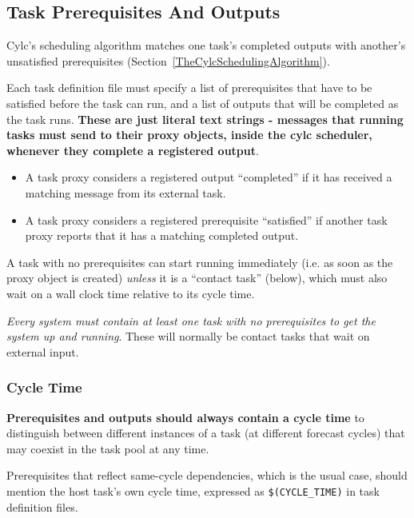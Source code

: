 \documentclass[11pt,a4paper]{article}
\begin{document}
\subsection{Task Prerequisites And Outputs}
\label{TaskPrerequisitesAndOutputs}

Cylc's scheduling algorithm matches one task's completed outputs with
another's unsatisfied prerequisites
(Section~\ref{TheCylcSchedulingAlgorithm}).  

Each task definition file must specify a list of prerequisites that have
to be satisfied before the task can run, and a list of outputs that will
be completed as the task runs. {\bf These are just literal text
strings - messages that running tasks must send to their proxy objects,
inside the cylc scheduler, whenever they complete a registered output}.

\begin{itemize}
    \item A task proxy considers a registered output ``completed''
        if it has received a matching message from its external task.

    \item A task proxy considers a registered prerequisite ``satisfied''
        if another task proxy reports that it has a matching completed
        output.

\end{itemize}

A task with no prerequisites can start running immediately (i.e. as soon
as the proxy object is created) {\em unless} it is a ``contact task''
(below), which must also wait on a wall clock time relative to its cycle time.

{\em Every system must contain at least one task with no prerequisites
to get the system up and running}. These will normally be contact tasks that wait
on external input.


\lstset{language=cylctaskdef} 

\subsubsection{Cycle Time}

{\bf Prerequisites and outputs should always contain a cycle time} to
distinguish between different instances of a task (at different 
forecast cycles) that may coexist in the task pool at any time. 

Prerequisites that reflect same-cycle dependencies, which is the usual
case, should mention the host task's own cycle time, expressed as
\lstinline=$(CYCLE_TIME)= in task definition files.
\end{document}
